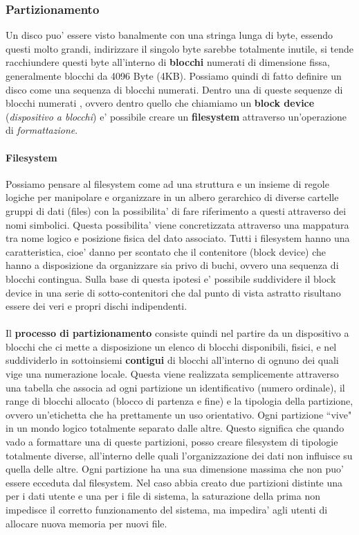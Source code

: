 \subsubsection{Partizionamento}
Un disco puo' essere visto banalmente con una stringa lunga di byte, essendo questi molto grandi, indirizzare il singolo byte sarebbe totalmente inutile, si tende racchiundere questi byte all'interno di \textbf{blocchi} numerati di dimensione fissa, generalmente blocchi da 4096 Byte (4KB). 
Possiamo quindi di fatto definire un disco come una sequenza di blocchi numerati. Dentro una di queste sequenze di blocchi numerati , ovvero dentro quello che chiamiamo un \textbf{block device} (\emph{dispositivo a blocchi}) e' possibile creare un \textbf{filesystem} attraverso un'operazione di \emph{formattazione}. 

\paragraph{Filesystem}
Possiamo pensare al filesystem come ad una struttura e un insieme di regole logiche per manipolare e organizzare in un albero gerarchico di diverse cartelle gruppi di dati (files) con la possibilita' di fare riferimento a questi attraverso dei nomi simbolici. Questa possibilita' viene concretizzata attraverso una mappatura tra nome logico e posizione fisica del dato associato. Tutti i filesystem hanno una caratteristica, cioe' danno per scontato che il contenitore (block device) che hanno a disposizione da organizzare sia privo di buchi, ovvero una sequenza di blocchi contingua. Sulla base di questa ipotesi e' possibile suddividere il block device in una serie di sotto-contenitori che dal punto di vista astratto risultano essere dei veri e propri dischi indipendenti.
\\\\
Il \textbf{processo di partizionamento} consiste quindi nel partire da un dispositivo a blocchi che ci mette a disposizione un elenco di blocchi disponibili, fisici, e nel suddividerlo in sottoinsiemi \textbf{contigui} di blocchi all'interno di ognuno dei quali vige una numerazione locale. Questa viene realizzata semplicemente attraverso una tabella che associa ad ogni partizione un identificativo (numero ordinale), il range di blocchi allocato (blocco di partenza e fine) e la tipologia della partizione, ovvero un'etichetta che ha prettamente un uso orientativo. 
Ogni partizione ``vive" in un mondo logico totalmente separato dalle altre. Questo significa che quando vado a formattare una di queste partizioni, posso creare filesystem di tipologie totalmente diverse, all'interno delle quali l'organizzazione dei dati non influisce su quella delle altre. Ogni partizione ha una sua dimensione massima che non puo' essere ecceduta dal filesystem. Nel caso abbia creato due partizioni distinte una per i dati utente e una per i file di sistema, la saturazione della prima non impedisce il corretto funzionamento del sistema, ma impedira' agli utenti di allocare nuova memoria per nuovi file.
